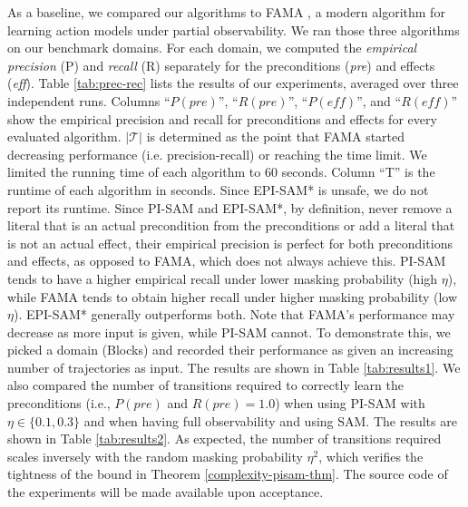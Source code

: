 \documentclass[letterpaper]{article} %
\newcommand{\pre}{\textit{pre}}
\newcommand{\eff}{\textit{eff}}
\begin{document}
As a baseline, we compared our algorithms to FAMA \citep{aineto2019learning}, a modern algorithm for learning action models under partial observability. We ran those three algorithms on our benchmark domains. %
For each domain, we computed the \textit{empirical precision} (P) and \textit{recall} (R) separately for the preconditions (\pre) and effects (\eff). 
Table \ref{tab:prec-rec} lists the results of our experiments, averaged over three independent runs. 
Columns ``$P(\pre)$'', ``$R(\pre)$'', ``$P(\eff)$'', and ``$R(\eff)$'' show the empirical precision and recall for preconditions and effects for every evaluated algorithm. 
$|\mathcal{T}|$ is determined as the point that FAMA started decreasing performance (i.e. precision-recall) or reaching the time limit. We limited the running time of each algorithm to 60 seconds. Column ``T'' is the runtime of each algorithm in seconds. %
Since EPI-SAM* is unsafe, we do not report its runtime. %
Since PI-SAM and EPI-SAM*, by definition, never remove a literal that is an actual precondition from the preconditions or add a literal that is not an actual effect, their empirical precision is perfect for both preconditions and effects, as opposed to FAMA, which does not always achieve this. 
PI-SAM tends to have a higher empirical recall under lower masking probability (high $\eta$), while FAMA tends to obtain higher recall under higher masking probability (low $\eta$). EPI-SAM* generally outperforms both. 
Note that FAMA's performance may decrease as more input is given, while PI-SAM cannot. 
To demonstrate this, we picked a domain (Blocks) and recorded their performance as given an increasing number of trajectories as input. The results are shown in Table \ref{tab:results1}. 
We also compared the number of transitions required to correctly learn the preconditions (i.e., $P(\pre)$ and $R(\pre) = 1.0$)
when using PI-SAM with $\eta\in\{0.1, 0.3\}$ and when having full observability and using SAM. 
The results are shown in Table \ref{tab:results2}. As expected, the number of transitions required scales inversely with the random masking probability $\eta^2$, which verifies the tightness of the bound in Theorem \ref{complexity-pisam-thm}. 
The source code of the experiments will be made available upon acceptance.
\end{document}
